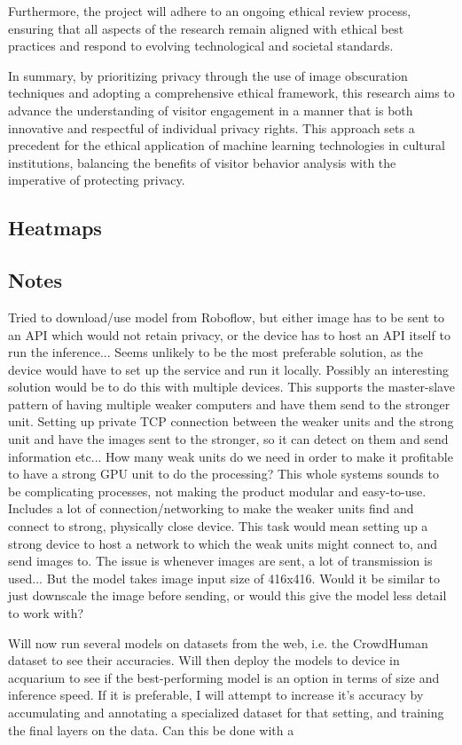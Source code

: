 Furthermore, the project will adhere to an ongoing ethical review process, ensuring that all aspects of the research remain aligned with ethical best practices and respond to evolving technological and societal standards.

In summary, by prioritizing privacy through the use of image obscuration techniques and adopting a comprehensive ethical framework, this research aims to advance the understanding of visitor engagement in a manner that is both innovative and respectful of individual privacy rights. This approach sets a precedent for the ethical application of machine learning technologies in cultural institutions, balancing the benefits of visitor behavior analysis with the imperative of protecting privacy.


\subsection{Heatmaps}
\label{sec:heatmaps}

\subsection*{Notes}
Tried to download/use model from Roboflow, but either image has to be sent to an API which would not retain privacy, or the device has to host an API itself to run the inference... Seems unlikely to be the most preferable solution, as the device would have to set up the service and run it locally. Possibly an interesting solution would be to do this with multiple devices. This supports the master-slave pattern of having multiple weaker computers and have them send to the stronger unit. Setting up private TCP connection between the weaker units and the strong unit and have the images sent to the stronger, so it can detect on them and send information etc... How many weak units do we need in order to make it profitable to have a strong GPU unit to do the processing? This whole systems sounds to be complicating processes, not making the product modular and easy-to-use. Includes a lot of connection/networking to make the weaker units find and connect to strong, physically close device.
    This task would mean setting up a strong device to host a network to which the weak units might connect to, and send images to. The issue is whenever images are sent, a lot of transmission is used... But the model takes image input size of 416x416. Would it be similar to just downscale the image before sending, or would this give the model less detail to work with?

Will now run several models on datasets from the web, i.e. the CrowdHuman dataset to see their accuracies. Will then deploy the models to device in acquarium to see if the best-performing model is an option in terms of size and inference speed. If it is preferable, I will attempt to increase it's accuracy by accumulating and annotating a specialized dataset for that setting, and training the final layers on the data. Can this be done with a 